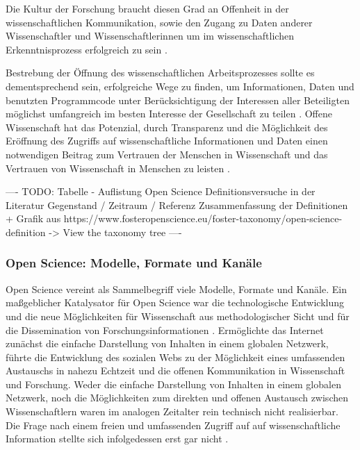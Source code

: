 Die Kultur der Forschung braucht diesen Grad an Offenheit in der wissenschaftlichen Kommunikation, sowie den Zugang zu Daten anderer Wissenschaftler und Wissenschaftlerinnen um im wissenschaftlichen Erkenntnisprozess erfolgreich zu sein \cite{Fecher_2015} \cite{Krumholz_2014} \cite{patlak_2010_open}.

Bestrebung der Öffnung des wissenschaftlichen Arbeitsprozesses sollte es dementsprechend sein, erfolgreiche Wege zu finden, um Informationen, Daten und benutzten Programmcode unter Berücksichtigung der Interessen aller Beteiligten möglichst umfangreich im besten Interesse der Gesellschaft zu teilen \cite{naeder_2010_open} \cite{Ross_2013} \cite{hey_2015_open}. Offene Wissenschaft hat das Potenzial, durch Transparenz und die Möglichkeit des Eröffnung des Zugriffs auf wissenschaftliche Informationen und Daten einen notwendigen Beitrag zum Vertrauen der Menschen in Wissenschaft und das Vertrauen von Wissenschaft in Menschen zu leisten \cite{grand_2012_open}.

---- TODO: Tabelle - Auflistung Open Science Definitionsversuche in der Literatur Gegenstand / Zeitraum / Referenz Zusammenfassung der Definitionen + Grafik aus https://www.fosteropenscience.eu/foster-taxonomy/open-science-definition -> View the taxonomy tree ----

\subsubsection{Open Science: Modelle, Formate und Kanäle}

Open Science vereint als Sammelbegriff viele Modelle, Formate und Kanäle. Ein maßgeblicher Katalysator für Open Science war die technologische Entwicklung und die neue Möglichkeiten für Wissenschaft aus methodologischer Sicht und für die Dissemination von Forschungsinformationen \cite{garcia_2010_open}. Ermöglichte das Internet zunächst die einfache Darstellung von Inhalten in einem globalen Netzwerk, führte die Entwicklung des sozialen Webs zu der Möglichkeit eines umfassenden Austauschs in nahezu Echtzeit und die offenen Kommunikation in Wissenschaft und Forschung. Weder die einfache Darstellung von Inhalten in einem globalen Netzwerk, noch die Möglichkeiten zum direkten und offenen Austausch zwischen Wissenschaftlern waren im analogen Zeitalter rein technisch nicht realisierbar. Die Frage nach einem freien und umfassenden Zugriff auf auf wissenschaftliche Information stellte sich infolgedessen erst gar nicht \cite{Schirmbacher_oa_2007}.

